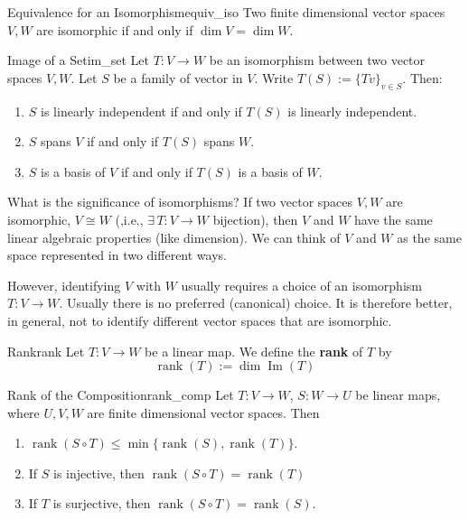 \begin{corollary}{Equivalence for an Isomorphism}{equiv_iso}
	Two finite dimensional vector spaces $V, W$ are isomorphic if and only if $\dim V = \dim W$.
\end{corollary}

\begin{theorem}{Image of a Set}{im_set}
	Let $T:V \to W$ be an isomorphism between two vector spaces $V, W$.
	Let $S$ be a family of vector in $V$. Write $T(S) := \{Tv\}_{v \in S}$. Then:
	\begin{enumerate}
		\item $S$ is linearly independent if and only if $T(S)$ is linearly independent.
		\item $S$ spans $V$ if and only if $T(S)$ spans $W$.
		\item $S$ is a basis of $V$ if and only if $T(S)$ is a basis of $W$.
	\end{enumerate}
\end{theorem}

What is the significance of isomorphisms? If two vector spaces $V, W$ are isomorphic, $V \cong W$ (,i.e., $\exists \, T:V \to W $ bijection), then $V$ and $W$ have the same linear algebraic properties (like dimension). We can think of $V$ and $W$ as the same space represented in two different ways.

However, identifying $V$ with $W$ usually requires a choice of an isomorphism $T:V \to W$. Usually there is no preferred (canonical) choice. It is therefore better, in general, not to identify different vector spaces that are isomorphic.

\begin{definition}{Rank}{rank}
	Let $T:V \to W$ be a linear map. We define the \textbf{rank} of $T$ by 
	\[
	\operatorname{rank}(T) := \dim \operatorname{Im}(T)
	\]
\end{definition}

\begin{lemma}{Rank of the Composition}{rank_comp}
	Let $T:V \to W$, $S:W \to U$ be linear maps, where $U, V, W$ are finite dimensional vector spaces. Then
	\begin{enumerate}
		\item $\operatorname{rank}(S \circ T) \leq \min\{\operatorname{rank}(S), \operatorname{rank}(T)\}$.
		\item If $S$ is injective, then $\operatorname{rank}(S \circ T) = \operatorname{rank}(T)$
		\item If $T$ is surjective, then $\operatorname{rank}(S \circ T) = \operatorname{rank}(S)$.
	\end{enumerate}
\end{lemma}

